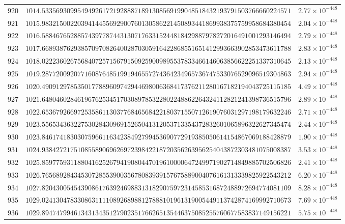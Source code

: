 \documentclass[12pt,reqno]{amsart}
\theoremstyle{remark}
\begin{document}
\begin{longtable}{clc}
$920$ & $1014.5335693099549492617219288871891308569199048518432193791503766660224571$ & $2.77\times 10^{-448}$ \\
$921$ & $1015.9832150022039414455692900760130586221450893441869938375759958684380454$ & $2.04\times 10^{-448}$ \\
$922$ & $1016.5884676528857439778744313071763315244818429887978272016491001293146494$ & $2.79\times 10^{-448}$ \\
$923$ & $1017.6689387629385709708264002870305916422868551651412993663902853473611788$ & $2.83\times 10^{-448}$ \\
$924$ & $1018.0222360267568407257156791509259009895537833466146063856622251337310645$ & $2.13\times 10^{-448}$ \\
$925$ & $1019.2877200920771608764851991946557274364234965736747533076529096519304863$ & $2.94\times 10^{-448}$ \\
$926$ & $1020.4909129785350177889609742944698006368417376211280167182194043725115185$ & $4.49\times 10^{-448}$ \\
$927$ & $1021.6480460284619676253451703089785322802248862264324112821241398736515796$ & $2.89\times 10^{-448}$ \\
$928$ & $1022.6536792669725358611303776846568422180371550712619076031297198179632246$ & $2.71\times 10^{-448}$ \\
$929$ & $1023.5565343632275302843096915265041312053713354372832601065896322627345474$ & $2.44\times 10^{-448}$ \\
$930$ & $1023.8461741830307596611634238492799453690772919385050614154867069188428879$ & $1.90\times 10^{-448}$ \\
$931$ & $1024.9384272175108558906962697239842218720356263956254043872303481075008387$ & $3.53\times 10^{-448}$ \\
$932$ & $1025.8597759311880416252679419080447019610000647249971902714849885702506826$ & $2.41\times 10^{-448}$ \\
$933$ & $1026.7656892843453072855390035678083939157675889004076161313339825922543212$ & $6.20\times 10^{-448}$ \\
$934$ & $1027.8204300545439086176392469883131829075972314585316872488972694774081109$ & $8.28\times 10^{-448}$ \\
$935$ & $1029.0241304783308631111089268988127888101961319005449113742874169992710673$ & $7.69\times 10^{-448}$ \\
$936$ & $1029.8947479946134313435127902351766265135446375085255760677583837149156221$ & $5.75\times 10^{-448}$ \\

\end{longtable}
\end{document}
